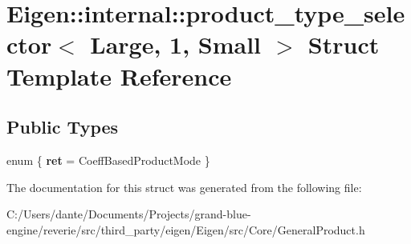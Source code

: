 \hypertarget{struct_eigen_1_1internal_1_1product__type__selector_3_01_large_00_011_00_01_small_01_4}{}\section{Eigen\+::internal\+::product\+\_\+type\+\_\+selector$<$ Large, 1, Small $>$ Struct Template Reference}
\label{struct_eigen_1_1internal_1_1product__type__selector_3_01_large_00_011_00_01_small_01_4}
\subsection*{Public Types}
\begin{DoxyCompactItemize}
\item 
\mbox{\label{struct_eigen_1_1internal_1_1product__type__selector_3_01_large_00_011_00_01_small_01_4_a2a029c813814097e64faf9f440b6fe83}} 
enum \{ {\bfseries ret} = Coeff\+Based\+Product\+Mode
 \}
\end{DoxyCompactItemize}


The documentation for this struct was generated from the following file\+:\begin{DoxyCompactItemize}
\item 
C\+:/\+Users/dante/\+Documents/\+Projects/grand-\/blue-\/engine/reverie/src/third\+\_\+party/eigen/\+Eigen/src/\+Core/General\+Product.\+h\end{DoxyCompactItemize}
